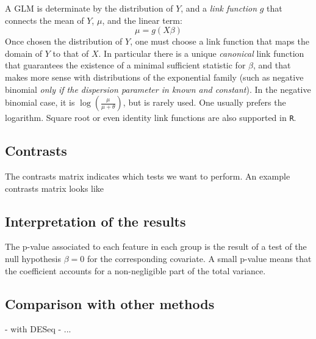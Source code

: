 \documentclass[a4paper,11pt]{article}
\begin{document}
A GLM is determinate by the distribution of $Y$, and a \emph{link function} $g$ that connects the mean of $Y$, $\mu$, and the linear term:
$$ \mu = g(X\beta) $$
Once chosen the distribution of $Y$, one must choose a link function that maps the domain of $Y$ to that of $X$. In particular there is a unique \emph{canonical} link function that guarantees the existence of a minimal sufficient statistic for $\beta$, and that makes more sense with distributions of the exponential family (such as negative binomial \emph{only if the dispersion parameter in known and constant}). In the negative binomial case, it is $\log(\frac{\mu}{\mu+\theta})$, but is rarely used. One usually prefers the logarithm. Square root or even identity link functions are also supported in \texttt{R}.


\subsection{Contrasts}
The contrasts matrix indicates which tests we want to perform. An example contrasts matrix looks like
$$  $$

\subsection{Interpretation of the results}
The p-value associated to each feature in each group is the result of a test of the null hypothesis $\beta=0$ for the corresponding covariate. A small p-value means that the coefficient accounts for a non-negligible part of the total variance.

\subsection{Comparison with other methods}
- with DESeq
- ...
\end{document}
